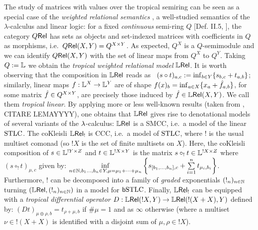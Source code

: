 \documentclass[submission,%
]{eptcs}
\begin{document}
The study of matrices with values over the tropical semiring can be seen as a special case of the
\emph{weighted relational semantics} \cite{Manzo2013}, a well-studied semantics of the $\lambda$-calculus and linear logic:
for a fixed \emph{continuous} semi-ring $Q$ [Def. II.5, \cite{Manzo2013}], the category $Q \mathsf{Rel}$ has sets as objects and set-indexed matrices with coefficients in $Q$ as morphisms, i.e.~${Q \mathsf{Rel}}(X,Y)=Q^{X\times Y}$. %
As expected, $Q^X$ is a $Q$-semimodule and we can identify ${Q \mathsf{Rel}}(X,Y)$ with the set of linear maps from $Q^X$ to $Q^Y$.
Taking $Q:=\mathbb{L}$ we obtain the \emph{tropical weighted relational model} $\mathbb{L} \mathsf{Rel}$.
It is worth observing that the composition in $\mathbb{L} \mathsf{Rel}$ %
reads as \ $(s\circ t)_{a,c}:=\inf_{b\in Y}\{s_{b,c}+t_{a,b}\}$;
similarly, linear maps $f:\mathbb{L}^X\to \mathbb{L}^Y$ are of shape $f(x)_b=\inf_{a\in X} \{x_a+\hat{f}_{a,b}\}$, for some matrix $\hat{f}\in Q^{X\times Y}$, are precisely those induced by $\hat{f}\in{\mathbb{L}\mathsf{Rel}}(X,Y)$. We call them \emph{tropical linear}.
By applying more or less well-known results (taken from \cite{Manzo2013}, CITARE LEMAYYYY), one obtains that $\mathbb{L} \mathsf{Rel}$ gives rise to denotational models of several variants of the $\lambda$-calculus:
$\mathbb{L} \mathsf{Rel}$ is a SMCC, i.e.\ a model of the linear $\mathrm{STLC}$.
The coKleisli $\mathbb{L} \mathsf{Rel}_!$ is CCC, i.e.\ a model of $\mathrm{STLC}$, where $!$ is the usual multiset comonad (so $!X$ is the set of finite multisets on $X$).
Here, the coKleisli composition of $s\in\mathbb{L}^{!Y\times Z}$ and $t\in\mathbb{L}^{!X\times Y}$ is the matrix $s\circ_! t\in\mathbb{L}^{!X\times Z}$ where $(s\circ_! t)_{\mu,c}$ given by:
$
 \inf\limits_{n\in\mathbb{N}, b_1\dots,b_n\in Y, \mu = \mu_1+\cdots +\mu_n}
 \left\{s_{[b_1,\dots,b_n],c} + \sum\limits_{i=1}^n t_{\mu_i,b_i}\right\}$.
Furthermore, $!$ can be decomposed into a family of \emph{graded} exponentials $(!_n)_{n\in\mathbb{N}}$ turning $(\mathbb{L} \mathsf{Rel},(!_n)_{n\in\mathbb{N}})$ in a model for $\mathsf b\mathrm{STLC}$. 
Finally, $\mathbb{L} \mathsf{Rel}_!$ can be equipped with a \emph{tropical differential operator} $D:{\mathbb{L} \mathsf{Rel}}(!X,Y)\to {\mathbb{L}\mathsf{Rel}}(!(X+X),Y)$ defined by: $(Dt)_{\mu\oplus\rho,b}=t_{\rho+\mu,b}$ if $\#\mu=1$ and as $\infty$ otherwise (where a multiset $\nu \in !(X+X)$ is identified with a disjoint sum of $\mu,\rho\in !X$).
\end{document}
